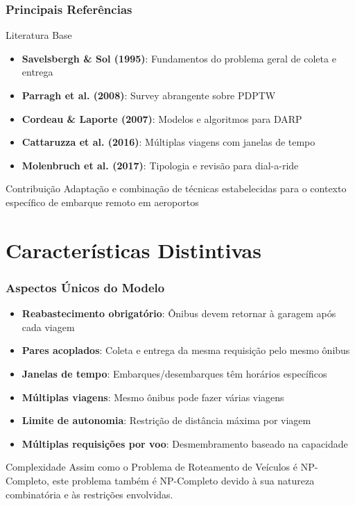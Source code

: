 \documentclass[10pt]{beamer}
\begin{document}
\begin{frame}
\frametitle{Principais Referências}
\begin{block}{Literatura Base}
\begin{itemize}
    \item \textbf{Savelsbergh \& Sol (1995)}: Fundamentos do problema geral de coleta e entrega
    \item \textbf{Parragh et al. (2008)}: Survey abrangente sobre PDPTW
    \item \textbf{Cordeau \& Laporte (2007)}: Modelos e algoritmos para DARP
    \item \textbf{Cattaruzza et al. (2016)}: Múltiplas viagens com janelas de tempo
    \item \textbf{Molenbruch et al. (2017)}: Tipologia e revisão para dial-a-ride
\end{itemize}
\end{block}

\begin{alertblock}{Contribuição}
Adaptação e combinação de técnicas estabelecidas para o contexto específico 
de embarque remoto em aeroportos
\end{alertblock}
\end{frame}

\section{Características Distintivas}

\begin{frame}
\frametitle{Aspectos Únicos do Modelo}
\begin{itemize}
    \item \textbf{Reabastecimento obrigatório}: Ônibus devem retornar à garagem após cada viagem
    \item \textbf{Pares acoplados}: Coleta e entrega da mesma requisição pelo mesmo ônibus
    \item \textbf{Janelas de tempo}: Embarques/desembarques têm horários específicos
    \item \textbf{Múltiplas viagens}: Mesmo ônibus pode fazer várias viagens
    \item \textbf{Limite de autonomia}: Restrição de distância máxima por viagem
    \item \textbf{Múltiplas requisições por voo}: Desmembramento baseado na capacidade
\end{itemize}

\vspace{0.5cm}
\begin{alertblock}{Complexidade}
Assim como o Problema de Roteamento de Veículos é NP-Completo, este problema também é NP-Completo devido à sua natureza combinatória e às restrições envolvidas.
\end{alertblock}
\end{frame}
\end{document}
